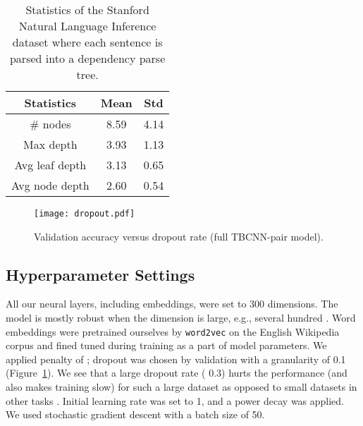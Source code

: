 \documentclass[11pt]{article}
\begin{document}
\begin{table}[!t]
\centering
\begin{tabular}{|ccc|}
\hline
\textbf{Statistics} & \textbf{Mean} &\textbf{Std}\\
\hline\hline
\# nodes   & 8.59 & 4.14\\
Max depth & 3.93 & 1.13\\
Avg leaf depth & 3.13 & 0.65\\
Avg node depth & 2.60 & 0.54\\
\hline
\end{tabular}
\caption{Statistics of the Stanford Natural Language Inference dataset where each sentence is parsed into a dependency parse tree.}\label{tab:statistics}
\end{table}
\begin{figure}[!t]
\centering
\texttt{[image: dropout.pdf]}
\vspace{-.3cm}
\caption{Validation accuracy versus dropout rate (full TBCNN-pair model).}\label{fig:dropout}
\end{figure}




\subsection{Hyperparameter Settings}\label{ss:hyperparameters}

All our neural layers, including embeddings, were set to 300 dimensions. The model is mostly robust when the dimension is large, e.g., several hundred \cite{unified}. Word embeddings were pretrained ourselves by {\tt word2vec} on the English Wikipedia corpus and fined tuned during training as a part of model parameters.  We applied  penalty of ; dropout was chosen by validation with a granularity of 0.1 (Figure~\ref{fig:dropout}). We see that a large dropout rate ( 0.3) hurts the performance (and also makes training slow) for such a large dataset as opposed to small datasets in other tasks \cite{regularization}. Initial learning rate was set to 1, and a power decay was applied. We used stochastic gradient descent with a batch size of 50.
\end{document}
